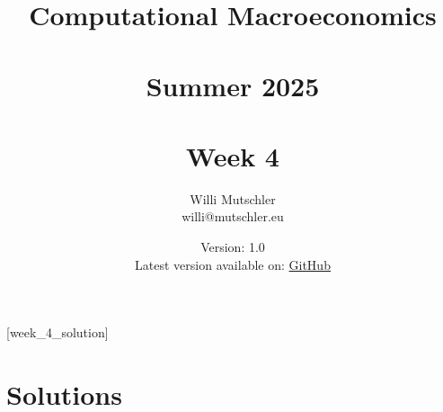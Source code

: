 
\newif\ifDisplaySolutions\DisplaySolutionstrue%


\title{Computational Macroeconomics\\~\\Summer 2025\\~\\Week 4}
\author{Willi Mutschler\\willi@mutschler.eu}
\date{Version: 1.0\\Latest version available on: \href{https://github.com/wmutschl/Computational-Macroeconomics/releases/latest/download/week_4.pdf}{GitHub}}
\maketitle\thispagestyle{empty}

\newpage
{}[week_4_solution]
\tableofcontents\thispagestyle{empty}\newpage

\setcounter{page}{1}
\newpage
\newpage
\printbibliography%
\newpage

\ifDisplaySolutions%
\newpage
\appendix
\section{Solutions}

\fi
